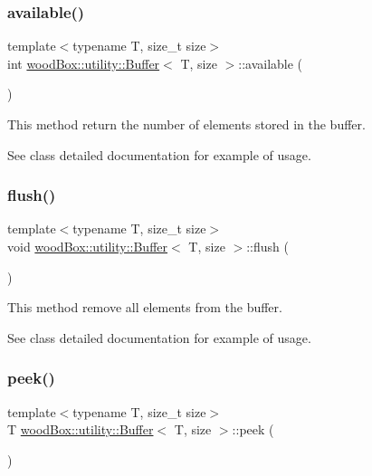 \subsubsection{\texorpdfstring{available()}{available()}}
{\footnotesize\ttfamily template$<$typename T, size\+\_\+t size$>$ \\
int \mbox{\hyperlink{classwood_box_1_1utility_1_1_buffer}{wood\+Box\+::utility\+::\+Buffer}}$<$ T, size $>$\+::available (\begin{DoxyParamCaption}{ }\end{DoxyParamCaption})\hspace{0.3cm}{\ttfamily [inline]}}

This method return the number of elements stored in the buffer.

See class detailed documentation for example of usage. \mbox{\label{classwood_box_1_1utility_1_1_buffer_a747e6bb3cd527dcf1651aa6758233666}} 
\subsubsection{\texorpdfstring{flush()}{flush()}}
{\footnotesize\ttfamily template$<$typename T, size\+\_\+t size$>$ \\
void \mbox{\hyperlink{classwood_box_1_1utility_1_1_buffer}{wood\+Box\+::utility\+::\+Buffer}}$<$ T, size $>$\+::flush (\begin{DoxyParamCaption}{ }\end{DoxyParamCaption})\hspace{0.3cm}{\ttfamily [inline]}}

This method remove all elements from the buffer.

See class detailed documentation for example of usage. \mbox{\label{classwood_box_1_1utility_1_1_buffer_a9aa51ab0987fdbcfb72fccc1c806ba50}} 
\subsubsection{\texorpdfstring{peek()}{peek()}}
{\footnotesize\ttfamily template$<$typename T, size\+\_\+t size$>$ \\
T \mbox{\hyperlink{classwood_box_1_1utility_1_1_buffer}{wood\+Box\+::utility\+::\+Buffer}}$<$ T, size $>$\+::peek (\begin{DoxyParamCaption}{ }\end{DoxyParamCaption})\hspace{0.3cm}{\ttfamily [inline]}}

